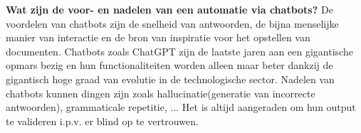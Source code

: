 \textbf{Wat zijn de voor- en nadelen van een automatie via chatbots?}
De voordelen van chatbots zijn de snelheid van antwoorden, de bijna menselijke manier van interactie en de bron van inspiratie voor het opstellen van documenten. 
Chatbots zoals ChatGPT zijn de laatste jaren aan een gigantische opmars bezig en hun functionaliteiten worden alleen maar beter dankzij de gigantisch hoge graad van evolutie in de technologische sector. 
Nadelen van chatbots kunnen dingen zijn zoals hallucinatie(generatie van incorrecte antwoorden), grammaticale repetitie, ... 
Het is altijd aangeraden om hun output te valideren i.p.v. er blind op te vertrouwen. 

